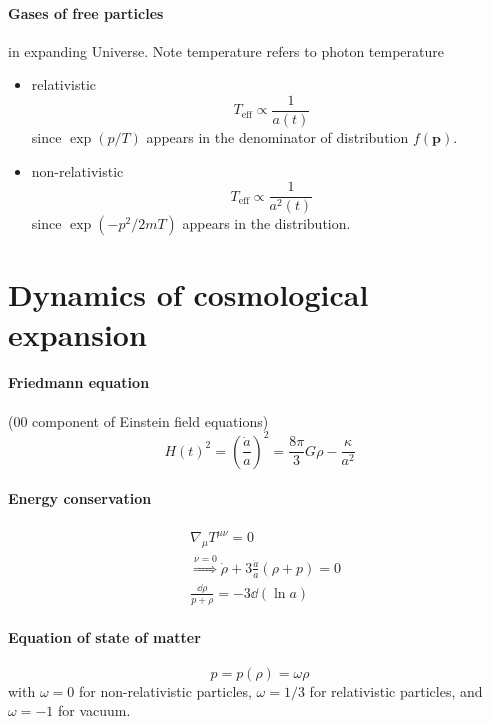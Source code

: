 \documentclass[12pt, a4paper, DIV=15]{article}
\numberwithin{equation}{section}
\newcommand{\eff}{\text{eff}}
\begin{document}
\paragraph{Gases of free particles} in expanding Universe. Note temperature refers to photon temperature
\begin{itemize}
   \item relativistic
      \begin{equation}
         T_\eff \propto \frac{1}{a(t)}
      \end{equation}
      since $\exp(p/T)$ appears in the denominator of distribution $f(\pmb{p})$.
   \item non-relativistic
      \begin{equation}
         T_\eff \propto \frac{1}{a^2(t)}
      \end{equation}
      since $\exp(-p^2/2mT)$ appears in the distribution.
\end{itemize}

\section{Dynamics of cosmological expansion}
\paragraph{Friedmann equation} ($00$ component of Einstein field equations)
\begin{equation}
   H(t)^2 = \left ( \frac{\dot{a}}{a} \right)^2  = \frac{8\pi}{3} G \rho - \frac{\kappa}{a^2}
   \label{Friedmann}
\end{equation}

\paragraph{Energy conservation}
\begin{align}
   &\nabla_\mu T^{\mu \nu} = 0 \\
   &\stackrel{\nu=0}{\Rightarrow} \dot{\rho} + 3 \frac{\dot{a}}{a} (\rho + p) = 0 \\
   & \frac{\dd{\rho}}{p + \rho} = -3 \dd{(\ln a)} \label{Econs}
\end{align}

\paragraph{Equation of state of matter}
\begin{equation}
   p = p(\rho) = \omega \rho
\end{equation}
with $\omega = 0$ for non-relativistic particles, $\omega=1/3$ for relativistic particles, and $\omega = -1$ for vacuum.
\end{document}
